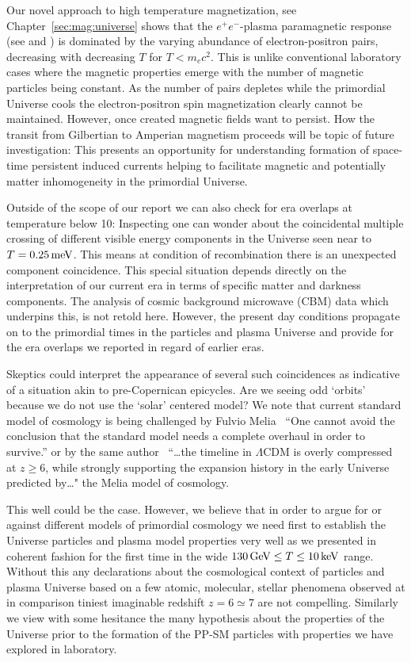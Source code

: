 Our novel approach to high temperature magnetization, see Chapter~\ref{sec:mag:universe} shows that the $e^{+}e^{-}$-plasma paramagnetic response (see  and ) is dominated by the varying abundance of electron-positron pairs, decreasing with decreasing $T$ for $T\!<\!m_{e}c^2$. This is unlike conventional laboratory cases where the magnetic properties emerge with the number of magnetic particles being constant.  As the number of pairs depletes while the primordial Universe cools the electron-positron spin magnetization clearly cannot be maintained. However, once created magnetic fields want to persist. How the transit from Gilbertian to Amperian magnetism proceeds will be topic of future investigation: This presents an opportunity for understanding formation of space-time persistent  induced currents helping to facilitate magnetic and potentially matter inhomogeneity in the primordial Universe. 
 
Outside of the scope of our report we can also check for era overlaps at temperature below 10\keV: Inspecting  one can wonder about the coincidental multiple crossing of different visible energy components in the Universe seen near to $T=0.25\text{\,meV}$. This means at condition of recombination there is an unexpected component coincidence. This special situation depends directly on the interpretation of our current era in terms of specific matter and darkness components. The analysis of cosmic background microwave (CBM) data which underpins this, is not retold here. However, the present day conditions propagate on to the primordial times in the particles and plasma Universe and provide for the era overlaps we reported in regard of earlier eras.

Skeptics could interpret the appearance of several such coincidences as indicative of a situation akin to pre-Copernican epicycles. Are we seeing odd `orbits' because we do not use the `solar' centered model? We note that current standard model of cosmology is being challenged by Fulvio Melia~\cite{Melia:2022itm} ``One cannot avoid the conclusion that the standard model needs a complete overhaul in order to survive.'' or by the same author~\cite{Melia:2024rzy} ``\ldots the timeline in $\Lambda$CDM is overly compressed at $z\ge 6$, while strongly supporting the expansion history in the early Universe predicted by\ldots" the Melia model of cosmology. 

This well could be the case. However, we believe that in order to argue for or against different models of primordial cosmology we need first to establish the Universe particles and plasma model properties very well as we presented in coherent fashion for the first time in the wide $130\text{\,GeV}\le T\le 10\text{\,keV}$ range. Without this any declarations about the cosmological context of particles and plasma Universe based on a few atomic, molecular, stellar phenomena observed at in comparison tiniest imaginable redshift $z=6\simeq7$ are not compelling. Similarly we view with some hesitance the many hypothesis about the properties of the Universe prior to the formation of the PP-SM particles with properties we have explored in laboratory.

